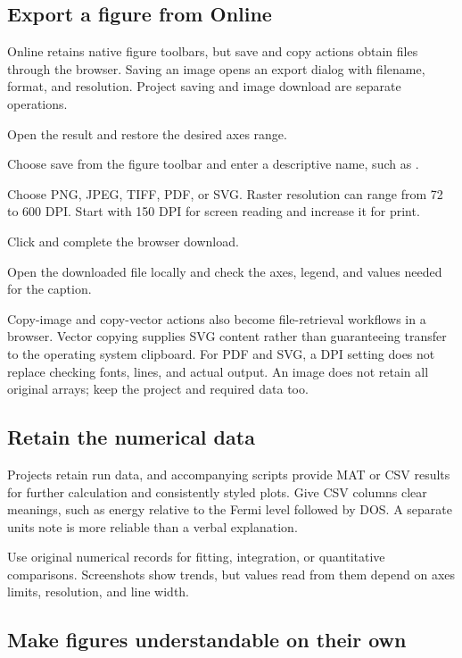 \subsection{Export a figure from Online}

Online retains native figure toolbars, but save and copy actions obtain files through the browser. Saving an image opens an export dialog with filename, format, and resolution. Project saving and image download are separate operations.

\begin{steps}
\item Open the result and restore the desired axes range.
\item Choose save from the figure toolbar and enter a descriptive name, such as .
\item Choose PNG, JPEG, TIFF, PDF, or SVG. Raster resolution can range from 72 to 600 DPI. Start with 150 DPI for screen reading and increase it for print.
\item Click  and complete the browser download.
\item Open the downloaded file locally and check the axes, legend, and values needed for the caption.
\end{steps}

Copy-image and copy-vector actions also become file-retrieval workflows in a browser. Vector copying supplies SVG content rather than guaranteeing transfer to the operating system clipboard. For PDF and SVG, a DPI setting does not replace checking fonts, lines, and actual output. An image does not retain all original arrays; keep the project and required data too.

\subsection{Retain the numerical data}

Projects retain run data, and accompanying scripts provide MAT or CSV results for further calculation and consistently styled plots. Give CSV columns clear meanings, such as energy relative to the Fermi level followed by DOS. A separate units note is more reliable than a verbal explanation.

Use original numerical records for fitting, integration, or quantitative comparisons. Screenshots show trends, but values read from them depend on axes limits, resolution, and line width.

\subsection{Make figures understandable on their own}

